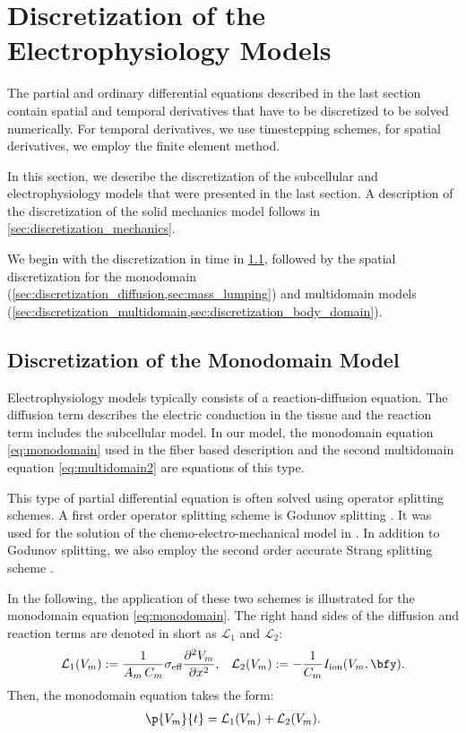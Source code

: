 \section{Discretization of the Electrophysiology Models}\label{sec:discretization}

The partial and ordinary differential equations described in the last section contain spatial and temporal derivatives that have to be discretized to be solved numerically. For temporal derivatives, we use timestepping schemes, for spatial derivatives, we employ the finite element method.

In this section, we describe the discretization of the subcellular and electrophysiology models that were presented in the last section. A description of the discretization of the solid mechanics model follows in \cref{sec:discretization_mechanics}.

We begin with the discretization in time in \cref{sec:discretization_monodomain}, followed by the spatial discretization for the monodomain (\cref{sec:discretization_diffusion,sec:mass_lumping}) and multidomain models (\cref{sec:discretization_multidomain,sec:discretization_body_domain}).

\subsection{Discretization of the Monodomain Model}\label{sec:discretization_monodomain}

Electrophysiology models typically consists of a reaction-diffusion equation. The diffusion term describes the electric conduction in the tissue and the reaction term includes the subcellular model. In our model, the monodomain equation  \cref{eq:monodomain} used in the fiber based description and the second multidomain equation \cref{eq:multidomain2} are equations of this type.

This type of partial differential equation is often solved using operator splitting schemes. A first order operator splitting scheme is Godunov splitting \cite{Godunov2003}. It was used for the solution of the chemo-electro-mechanical model in \cite{Roehrle2012}. In addition to Godunov splitting, we also employ the second order accurate Strang splitting scheme \cite{Strang1968}.

In the following, the application of these two schemes is illustrated for the monodomain equation \cref{eq:monodomain}. The right hand sides of the diffusion and reaction terms are denoted in short as $\mathcal{L}_1$ and $\mathcal{L}_2$:%
\begin{align*}
  \mathcal{L}_1(V_m) := \dfrac{1}{A_m\,C_m} \sigma_\text{eff}\dfrac{\partial^2 V_m}{\partial x^2}, &&
  \mathcal{L}_2(V_m) := -\dfrac{1}{C_m} I_\text{ion}(V_m,\bfy).
\end{align*}
%
Then, the monodomain equation takes the form:
%
\begin{align}\label{eq:monodomain_operator_splitting}
  \p{V_m}{t} = \mathcal{L}_1(V_m) + \mathcal{L}_2(V_m).
\end{align}


